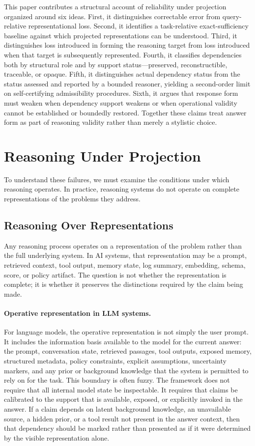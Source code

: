 \documentclass[11pt]{article}
\begin{document}
This paper contributes a structural account of reliability under projection organized around six ideas. First, it distinguishes correctable error from query-relative representational loss. Second, it identifies a task-relative exact-sufficiency baseline against which projected representations can be understood. Third, it distinguishes loss introduced in forming the reasoning target from loss introduced when that target is subsequently represented. Fourth, it classifies dependencies both by structural role and by support status---preserved, reconstructible, traceable, or opaque. Fifth, it distinguishes actual dependency status from the status assessed and reported by a bounded reasoner, yielding a second-order limit on self-certifying admissibility procedures. Sixth, it argues that response form must weaken when dependency support weakens or when operational validity cannot be established or boundedly restored. Together these claims treat answer form as part of reasoning validity rather than merely a stylistic choice.

\section{Reasoning Under Projection}

To understand these failures, we must examine the conditions under which reasoning operates. In practice, reasoning systems do not operate on complete representations of the problems they address.

\subsection{Reasoning Over Representations}

Any reasoning process operates on a representation of the problem rather than the full underlying system. In AI systems, that representation may be a prompt, retrieved context, tool output, memory state, log summary, embedding, schema, score, or policy artifact. The question is not whether the representation is complete; it is whether it preserves the distinctions required by the claim being made.

\paragraph{Operative representation in LLM systems.}
For language models, the operative representation is not simply the user prompt. It includes the information basis available to the model for the current answer: the prompt, conversation state, retrieved passages, tool outputs, exposed memory, structured metadata, policy constraints, explicit assumptions, uncertainty markers, and any prior or background knowledge that the system is permitted to rely on for the task. This boundary is often fuzzy. The framework does not require that all internal model state be inspectable. It requires that claims be calibrated to the support that is available, exposed, or explicitly invoked in the answer. If a claim depends on latent background knowledge, an unavailable source, a hidden prior, or a tool result not present in the answer context, then that dependency should be marked rather than presented as if it were determined by the visible representation alone.
\end{document}
